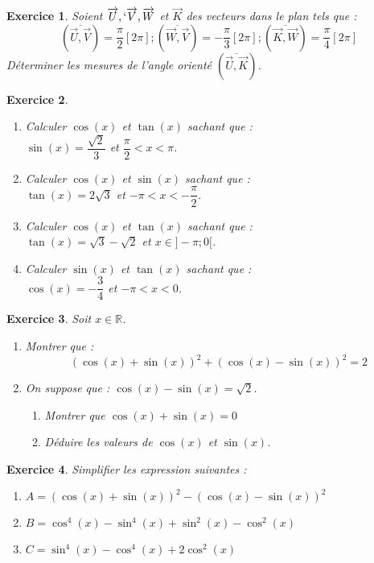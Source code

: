 \documentclass[12pt,a4paper]{article}
\newcommand{\vect}{\overrightarrow}
\newcommand{\lin}{\overline}
\newcommand{\R}{\mathbb{R}}
\theoremstyle{mystyle}
\newtheorem{exo}{Exercice}
\begin{document}
\begin{multicols*}{2}
\begin{exo}
Soient \( \vect{U}, `\vect{V}, \vect{W} \) et \( \vect{K} \) des vecteurs dans le plan tels que :
\[
\left( \lin{\vect{U}, \vect{V}} \right) = \dfrac{\pi}{2} [2\pi] ; \left( \lin{\vect{W}, \vect{V}} \right) = -\dfrac{\pi}{3} [2\pi] ; \left( \lin{\vect{K}, \vect{W}} \right) = \dfrac{\pi}{4} [2\pi]
\]
Déterminer les mesures de l'angle orienté \( \left(\lin{\vect{U}, \vect{K}}\right) \).
\end{exo}
\newcolumn
\begin{exo}
\text{ }
\begin{enumerate}
	\item Calculer $\cos(x)$ et $\tan(x)$ sachant que :\\ $\sin(x) = \dfrac{\sqrt{2}}{3}$ et $\dfrac{\pi}{2} < x < \pi$.
	\item Calculer $\cos(x)$ et $\sin(x)$ sachant que :\\ $\tan(x) = 2\sqrt{3}$ et $-\pi < x < -\dfrac{\pi}{2}$.
	\item Calculer $\cos(x)$ et $\tan(x)$ sachant que :\\ $\tan(x) = \sqrt{3} - \sqrt{2}$ et $x\in]-\pi;0[$.
	\item Calculer $\sin(x)$ et $\tan(x)$ sachant que :\\ $\cos(x) = -\dfrac{3}{4}$ et $-\pi < x < 0$.
	
	
\end{enumerate}

\end{exo}

\begin{exo}
Soit $x\in\R$.
\begin{enumerate}
	\item Montrer que : $$(\cos(x) + \sin(x))^2 + (\cos(x) - \sin(x))^2 = 2$$
	\item On suppose que : $\cos(x) - \sin(x) = \sqrt{2}$.
		\begin{enumerate}
			\item Montrer que $\cos(x) + \sin(x) = 0$
			\item Déduire les valeurs de $\cos(x)$ et $\sin(x)$.
		\end{enumerate}
\end{enumerate}
\end{exo}

\begin{exo}
Simplifier les expression suivantes :
\begin{enumerate}
	\item $A = (\cos(x) + \sin(x))^2 - (\cos(x) - \sin(x))^2$
	\item $B = \cos^4(x) - \sin^4(x) + \sin^2(x) - \cos^2(x)$
	\item $C = \sin^4(x) - \cos^4(x) + 2\cos^2(x)$
\end{enumerate}
\end{exo}


\end{multicols*}
\end{document}
